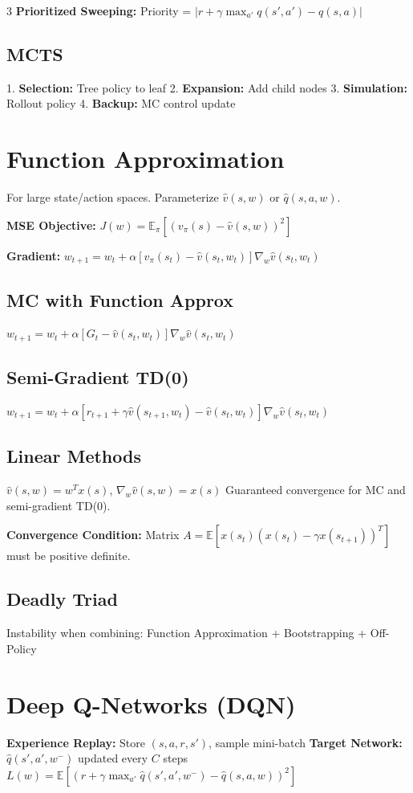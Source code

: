 \documentclass[8pt,landscape,a4paper]{article}
\begin{document}
\begin{multicols*}{3}
\textbf{Prioritized Sweeping:} Priority = $|r + \gamma \max_{a'} q(s',a') - q(s,a)|$

\subsection{MCTS}
1. \textbf{Selection:} Tree policy to leaf
2. \textbf{Expansion:} Add child nodes
3. \textbf{Simulation:} Rollout policy
4. \textbf{Backup:} MC control update

\section{Function Approximation}
For large state/action spaces. Parameterize $\hat{v}(s,w)$ or $\hat{q}(s,a,w)$.

\textbf{MSE Objective:} $J(w) = \mathbb{E}_\pi[(v_\pi(s) - \hat{v}(s,w))^2]$

\textbf{Gradient:} $w_{t+1} = w_t + \alpha[v_\pi(s_t) - \hat{v}(s_t,w_t)] \nabla_w \hat{v}(s_t,w_t)$

\subsection{MC with Function Approx}
$w_{t+1} = w_t + \alpha[G_t - \hat{v}(s_t,w_t)] \nabla_w \hat{v}(s_t,w_t)$

\subsection{Semi-Gradient TD(0)}
$w_{t+1} = w_t + \alpha[r_{t+1} + \gamma \hat{v}(s_{t+1},w_t) - \hat{v}(s_t,w_t)] \nabla_w \hat{v}(s_t,w_t)$

\subsection{Linear Methods}
$\hat{v}(s,w) = w^T x(s)$, $\nabla_w \hat{v}(s,w) = x(s)$
Guaranteed convergence for MC and semi-gradient TD(0).

\textbf{Convergence Condition:} Matrix $A = \mathbb{E}[x(s_t)(x(s_t) - \gamma x(s_{t+1}))^T]$ must be positive definite.

\subsection{Deadly Triad}
Instability when combining: Function Approximation + Bootstrapping + Off-Policy

\section{Deep Q-Networks (DQN)}
\textbf{Experience Replay:} Store $(s,a,r,s')$, sample mini-batch
\textbf{Target Network:} $\hat{q}(s',a',w^-)$ updated every $C$ steps
$L(w) = \mathbb{E}[(r + \gamma \max_{a'} \hat{q}(s',a',w^-) - \hat{q}(s,a,w))^2]$


\end{multicols*}
\end{document}
